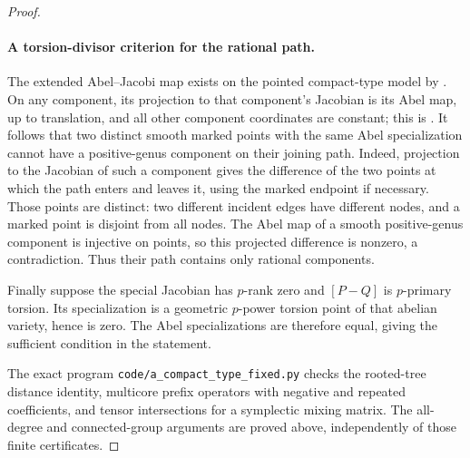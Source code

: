 \begin{proof}
\paragraph{A torsion-divisor criterion for the rational path.}
The extended Abel--Jacobi map exists on the pointed
compact-type model by
\cite[Theorem 1.1]{fghDupuyRabinoff}. On any component,
its projection to that component's Jacobian is its
Abel map, up to translation, and all other component
coordinates are constant; this is
\cite[Proposition 3.2, pp.5--6]{fghDupuyRabinoff}.
It follows that two distinct smooth marked points with
the same Abel specialization cannot have a positive-genus
component on their joining path. Indeed, projection to
the Jacobian of such a component gives the difference
of the two points at which the path enters and leaves
it, using the marked endpoint if necessary. Those
points are distinct: two different incident edges have
different nodes, and a marked point is disjoint from
all nodes. The Abel map of a smooth positive-genus
component is injective on points, so this projected
difference is nonzero, a contradiction. Thus their
path contains only rational components.

Finally suppose the special Jacobian has \(p\)-rank
zero and \([P-Q]\) is \(p\)-primary torsion. Its
specialization is a geometric \(p\)-power torsion
point of that abelian variety, hence is zero. The
Abel specializations are therefore equal, giving the
sufficient condition in the statement.

The exact program \texttt{code/a\_compact\_type\_fixed.py}
checks the rooted-tree distance identity, multicore
prefix operators with negative and repeated coefficients,
and tensor intersections for a symplectic mixing matrix.
The all-degree and connected-group arguments are proved
above, independently of those finite certificates.
\end{proof}
